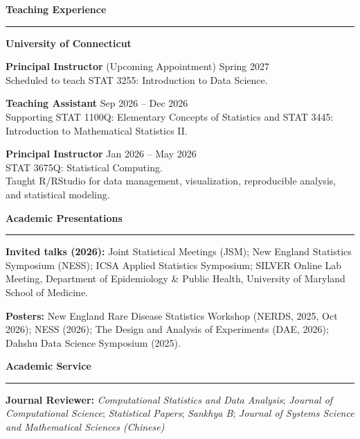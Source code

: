 \documentclass[a4paper,10pt]{article}
\newcommand{\majoritemsep}{\vspace{4pt}}
\newcommand{\resheading}[1]{
  \vspace{4pt}
  \noindent\textbf{\large #1}\par
  \vspace{2pt}
  \hrule
  \vspace{4pt}
}
\newenvironment{reslist}[1][0pt]{%
  \begin{list}{}{%
    \setlength{\leftmargin}{0pt}%
    \setlength{\rightmargin}{0pt}%
    \setlength{\labelwidth}{0pt}%
    \setlength{\labelsep}{0pt}%
    \setlength{\itemindent}{0pt}%
    \setlength{\listparindent}{0pt}%
    \setlength{\itemsep}{#1}%
    \setlength{\topsep}{0pt}%
    \setlength{\parsep}{0pt}%
    \setlength{\partopsep}{0pt}%
  }%
}{\end{list}}
\begin{document}
\resheading{Teaching Experience}
\textbf{University of Connecticut}
\begin{reslist}[2pt]
  \item \textbf{Principal Instructor} (Upcoming Appointment) \hfill Spring 2027 \\
  Scheduled to teach STAT 3255: Introduction to Data Science.
  \item \textbf{Teaching Assistant} \hfill Sep 2026 -- Dec 2026 \\
  Supporting STAT 1100Q: Elementary Concepts of Statistics and STAT 3445: Introduction to Mathematical Statistics II.
  \item \textbf{Principal Instructor} \hfill Jan 2026 -- May 2026 \\
  STAT 3675Q: Statistical Computing. \\
  Taught R/RStudio for data management, visualization, reproducible analysis, and statistical modeling.
\end{reslist}
\majoritemsep

\resheading{Academic Presentations}
\begin{reslist}[2pt]
   \item \textbf{Invited talks (2026):} Joint Statistical Meetings (JSM); New England Statistics Symposium (NESS); ICSA Applied Statistics Symposium; SILVER Online Lab Meeting, Department of Epidemiology \& Public Health, University of Maryland School of Medicine.
   \item \textbf{Posters:} New England Rare Disease Statistics Workshop (NERDS, 2025, Oct 2026); NESS (2026); The Design and Analysis of Experiments (DAE, 2026); Dahshu Data Science Symposium (2025).
\end{reslist}
\majoritemsep

\resheading{Academic Service}
\begin{reslist}[2pt]
   \item \textbf{Journal Reviewer:} \textit{Computational Statistics and Data Analysis}; \textit{Journal of Computational Science}; \textit{Statistical Papers}; \textit{Sankhya B}; \textit{Journal of Systems Science and Mathematical Sciences (Chinese)}
\end{reslist}
\majoritemsep
\end{document}
